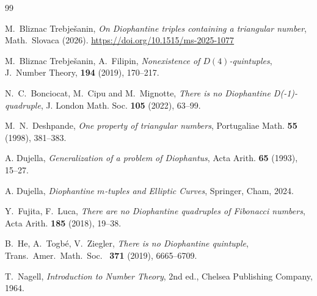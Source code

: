 \documentclass[12pt]{amsart}
\theoremstyle{definition}
\begin{document}
\begin{thebibliography}{99}

 M.~Bliznac Trebje\v{s}anin, {\it On Diophantine triples containing a triangular number}, {Math.~Slovaca} (2026). \url{https://doi.org/10.1515/ms-2025-1077}

 M.~Bliznac Trebje\v{s}anin, A.~Filipin, {\it Nonexistence of $D(4)$-quintuples}, {  J.~Number Theory}, \textbf{194} (2019), 170--217.

 N.~C.~Bonciocat, M.~Cipu and M.~Mignotte, {\it There is no Diophantine D(-1)-quadruple}, J. London Math. Soc. \textbf{105} (2022), 63--99.

M.~N.~Deshpande, {\it One property of triangular numbers}, Portugaliae Math. \textbf{55} (1998), 381--383.

 A. Dujella, {\it Generalization of a problem of Diophantus}, Acta Arith. \textbf{65} (1993), 15--27.

 A. Dujella, {\it Diophantine $m$-tuples and Elliptic Curves}, Springer, Cham, 2024.

 Y.~Fujita, F.~Luca, {\it There are no Diophantine quadruples of Fibonacci numbers}, Acta Arith. \textbf{185} (2018), 19--38.

 B.~He, A.~Togb\'{e}, V.~Ziegler, {\it There is no Diophantine quintuple}, {  Trans.~Amer.~Math.~Soc.~} \textbf{371} (2019), 6665--6709.

T.~Nagell, \emph{Introduction to Number Theory}, 2nd ed., Chelsea Publishing Company, 1964.

\end{thebibliography}
\end{document}
